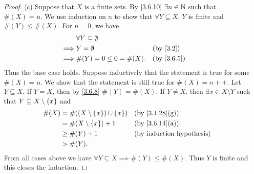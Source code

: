 \begin{proof}{(c)}
  Suppose that \(X\) is a finite sets.
  By \cref{3.6.10} \(\exists n \in \mathbb{N}\) such that \(\#(X) = n\).
  We use induction on \(n\) to show that \(\forall Y \subseteq X\), \(Y\) is finite and \(\#(Y) \leq \#(X)\).
  For \(n = 0\), we have
  \begin{align*}
             & \forall Y \subseteq \emptyset                             \\
    \implies & Y = \emptyset                 &  & \text{(by \cref{3.2})} \\
    \implies & \#(Y) = 0 \leq 0 = \#(X).     &  & \by{3.6.5}
  \end{align*}
  Thus the base case holds.
  Suppose inductively that the statement is true for some \(\#(X) = n\).
  We show that the statement is still true for \(\#(X) = n++\).
  Let \(Y \subseteq X\).
  If \(Y = X\), then by \cref{3.6.8} \(\#(Y) = \#(X)\).
  If \(Y \neq X\), then \(\exists x \in X \setminus Y\) such that \(Y \subseteq X \setminus \left\lbrace x\right\rbrace\) and
  \begin{align*}
    \#(X) & = \#((X \setminus \set{x}) \cup \set{x}) &  & \text{(by \cref{3.1.28}(g))} \\
          & = \#(X \setminus \set{x}) + 1            &  & \text{(by \cref{3.6.14}(a))} \\
          & \geq \#(Y) + 1                           &  & \byIH                        \\
          & > \#(Y).
  \end{align*}
  From all cases above we have \(\forall Y \subseteq X \implies \#(Y) \leq \#(X)\).
  Thus \(Y\) is finite and this closes the induction.


\end{proof}
